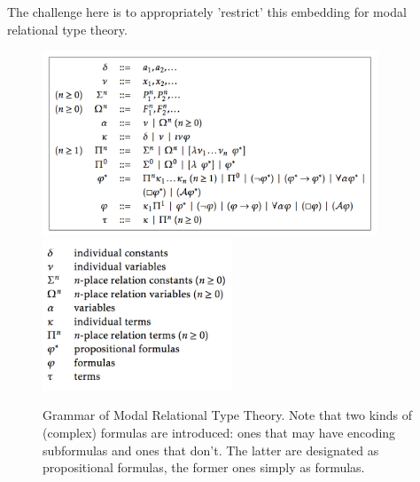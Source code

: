 \begin{isabellebody}
\begin{isamarkuptext}
  The challenge here is to appropriately 'restrict' this embedding for modal relational type theory.
   \begin{figure}[t]
  \includegraphics[height=5.5cm]{ModalRelationalTypeTheory.png}\includegraphics[height=4.5cm]{ModalRelationalTypeTheory2.png}
  \caption{Grammar of Modal Relational Type Theory. \label{mmrt}
  Note that two kinds of (complex) formulas are introduced: ones that may have encoding subformulas and 
  ones that don’t. The latter are designated as propositional formulas, the former ones simply as formulas. }
  \end{figure}


\end{isamarkuptext}
\end{isabellebody}
